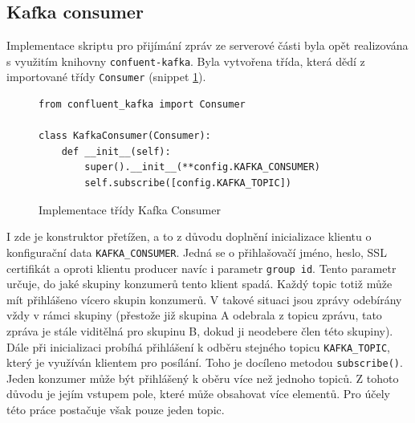 \documentclass[thesis=M,czech,hidelinks]{FITthesis}[2013/05/06]
\begin{document}
\subsection{Kafka consumer} \label{sec:kafkaconsumer}
Implementace skriptu pro přijímání zpráv ze serverové části byla opět realizována s využitím knihovny \texttt{confuent-kafka}. Byla vytvořena třída, která dědí z importované třídy \texttt{Consumer} (snippet \ref{snip:kafkaconsumer}).
\begin{figure}[h]               
	\begin{verbatim}
from confluent_kafka import Consumer

class KafkaConsumer(Consumer):
    def __init__(self):
        super().__init__(**config.KAFKA_CONSUMER)
        self.subscribe([config.KAFKA_TOPIC])
	\end{verbatim}      
	\caption{Implementace třídy Kafka Consumer}
	\label{snip:kafkaconsumer}
\end{figure}
I zde je konstruktor přetížen, a to z důvodu doplnění inicializace klientu o konfigurační data \texttt{KAFKA_CONSUMER}. Jedná se o přihlašovačí jméno, heslo, SSL certifikát a oproti klientu producer navíc i parametr \texttt{group id}. Tento parametr určuje, do jaké skupiny konzumerů tento klient spadá. Každý topic totiž může mít přihlášeno vícero skupin konzumerů. V takové situaci jsou zprávy odebírány vždy v rámci skupiny (přestože již skupina A odebrala z topicu zprávu, tato zpráva je stále viditělná pro skupinu B, dokud ji neodebere člen této skupiny). Dále při inicializaci probíhá přihlášení k odběru stejného topicu \texttt{KAFKA_TOPIC}, který je využíván klientem pro posílání. Toho je docíleno metodou \texttt{subscribe()}. Jeden konzumer může být přihlášený k oběru více než jednoho topiců. Z tohoto důvodu je jejím vstupem pole, které může obsahovat více elementů. Pro účely této práce postačuje však pouze jeden topic.
\end{document}
